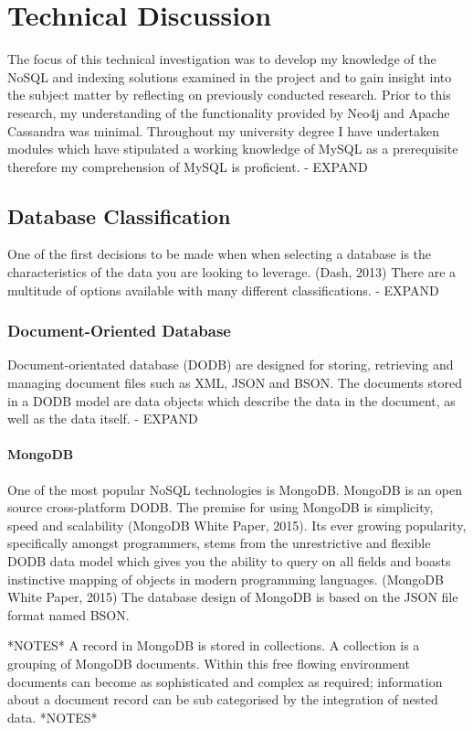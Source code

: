 \chapter{Technical Discussion}
The focus of this technical investigation was to develop my knowledge of the NoSQL and indexing solutions examined in the project and to gain insight into the subject matter by reflecting on previously conducted research. Prior to this research, my understanding of the functionality provided by Neo4j and Apache Cassandra was minimal. Throughout my university degree I have undertaken modules which have stipulated a working knowledge of MySQL as a prerequisite therefore my comprehension of MySQL is proficient. - EXPAND

\section{Database Classification}
One of the first decisions to be made when when selecting a database is the characteristics of the data you are looking to leverage. (Dash, 2013) There are a multitude of options available with many different classifications. - EXPAND

\subsection{Document-Oriented Database}
Document-orientated database (DODB) are designed for storing, retrieving and managing document files such as XML, JSON and BSON. The documents stored in a DODB model are data objects which describe the data in the document, as well as the data itself. - EXPAND

\subsubsection{MongoDB}\label{mongo}
One of the most popular NoSQL technologies is MongoDB. MongoDB is an open source cross-platform DODB. The premise for using MongoDB is simplicity, speed and scalability (MongoDB White Paper, 2015). Its ever growing popularity, specifically amongst programmers, stems from the unrestrictive and flexible DODB data model which gives you the ability to query on all fields and boasts instinctive mapping of objects in modern programming languages. (MongoDB White Paper, 2015) The database design of MongoDB is based on the JSON file format named BSON.

*NOTES* A record in MongoDB is stored in collections. A collection is a grouping of MongoDB documents.
Within this free flowing environment documents can become as sophisticated and complex as required; information about a document record can be sub categorised by the integration of nested data. *NOTES*

